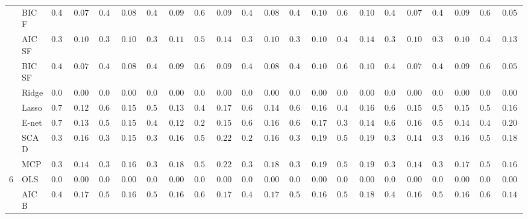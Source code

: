 \begin{tabular}{p{0.2cm}p{1cm}|p{0.6cm}p{0.6cm}|p{0.6cm}p{0.6cm}p{0.6cm}p{0.6cm}p{0.6cm}p{0.6cm}|p{0.6cm}p{0.6cm}p{0.6cm}p{0.6cm}p{0.6cm}p{0.6cm}|p{0.6cm}p{0.6cm}p{0.6cm}p{0.6cm}p{0.6cm}p{0.6cm}}
 & BIC F  & $0.430$ & $0.0718$ & $0.436$ & $0.0823$ & $0.470$ & $0.0959$ & $0.656$ & $0.0903$ & $0.448$ & $0.0858$ & $0.458$ & $0.1037$ & $0.612$ & $0.1094$ & $0.422$ & $0.0799$ & $0.456$ & $0.0903$ & $0.608$ & $0.0563$ \\
 & AIC SF  & $0.338$ & $0.1013$ & $0.328$ & $0.1045$ & $0.356$ & $0.1122$ & $0.520$ & $0.1421$ & $0.326$ & $0.1088$ & $0.344$ & $0.1028$ & $0.486$ & $0.1484$ & $0.330$ & $0.1078$ & $0.354$ & $0.1058$ & $0.492$ & $0.1316$ \\
 & BIC SF  & $0.430$ & $0.0718$ & $0.436$ & $0.0823$ & $0.470$ & $0.0959$ & $0.656$ & $0.0903$ & $0.448$ & $0.0858$ & $0.458$ & $0.1037$ & $0.612$ & $0.1094$ & $0.422$ & $0.0799$ & $0.456$ & $0.0903$ & $0.608$ & $0.0563$ \\
 & Ridge  & $0.000$ & $0.0000$ & $0.000$ & $0.0000$ & $0.000$ & $0.0000$ & $0.000$ & $0.0000$ & $0.000$ & $0.0000$ & $0.000$ & $0.0000$ & $0.000$ & $0.0000$ & $0.000$ & $0.0000$ & $0.000$ & $0.0000$ & $0.000$ & $0.0000$ \\
 & Lasso  & $0.724$ & $0.1232$ & $0.624$ & $0.1564$ & $0.528$ & $0.1349$ & $0.490$ & $0.1738$ & $0.698$ & $0.1407$ & $0.658$ & $0.1615$ & $0.490$ & $0.1691$ & $0.670$ & $0.1592$ & $0.596$ & $0.1530$ & $0.560$ & $0.1633$ \\
 & E-net  & $0.706$ & $0.1317$ & $0.592$ & $0.1555$ & $0.466$ & $0.1241$ & $0.296$ & $0.1595$ & $0.672$ & $0.1621$ & $0.608$ & $0.1727$ & $0.398$ & $0.1491$ & $0.654$ & $0.1604$ & $0.580$ & $0.1491$ & $0.466$ & $0.2071$ \\
 & SCAD  & $0.306$ & $0.1669$ & $0.306$ & $0.1594$ & $0.326$ & $0.1697$ & $0.558$ & $0.2226$ & $0.248$ & $0.1685$ & $0.312$ & $0.1914$ & $0.502$ & $0.1938$ & $0.302$ & $0.1463$ & $0.322$ & $0.1679$ & $0.502$ & $0.1809$ \\
 & MCP  & $0.360$ & $0.1449$ & $0.352$ & $0.1636$ & $0.356$ & $0.1898$ & $0.556$ & $0.2231$ & $0.302$ & $0.1875$ & $0.358$ & $0.1996$ & $0.510$ & $0.1915$ & $0.340$ & $0.1435$ & $0.362$ & $0.1722$ & $0.534$ & $0.1659$ \\\hline
6 & OLS  & $0.000$ & $0.0000$ & $0.000$ & $0.0000$ & $0.000$ & $0.0000$ & $0.000$ & $0.0000$ & $0.000$ & $0.0000$ & $0.000$ & $0.0000$ & $0.000$ & $0.0000$ & $0.000$ & $0.0000$ & $0.000$ & $0.0000$ & $0.000$ & $0.0000$ \\
 & AIC B  & $0.478$ & $0.1727$ & $0.516$ & $0.1686$ & $0.542$ & $0.1640$ & $0.640$ & $0.1752$ & $0.492$ & $0.1739$ & $0.526$ & $0.1649$ & $0.586$ & $0.1870$ & $0.476$ & $0.1628$ & $0.508$ & $0.1619$ & $0.624$ & $0.1485$ \\

\end{tabular}
